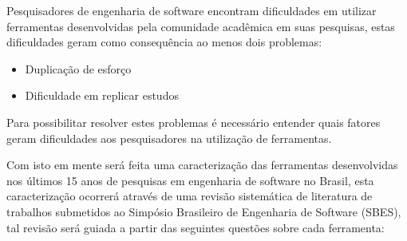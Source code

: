 \documentclass[conference]{IEEEtran}
\begin{document}

Pesquisadores de engenharia de software encontram dificuldades em utilizar
ferramentas desenvolvidas pela comunidade acadêmica em suas pesquisas,
estas dificuldades geram como consequência ao menos dois problemas:

\begin{itemize}
\item Duplicação de esforço
\item Dificuldade em replicar estudos
\end{itemize}

Para possibilitar resolver estes problemas é necessário entender quais fatores
geram dificuldades aos pesquisadores na utilização de ferramentas.

Com isto em mente será feita uma caracterização das ferramentas
desenvolvidas nos últimos 15 anos de pesquisas em engenharia de software no
Brasil, esta caracterização ocorrerá através de uma revisão sistemática de
literatura de trabalhos submetidos ao Simpósio Brasileiro de Engenharia de
Software (SBES), tal revisão será guiada a partir das seguintes questões sobre
cada ferramenta:
\end{document}
